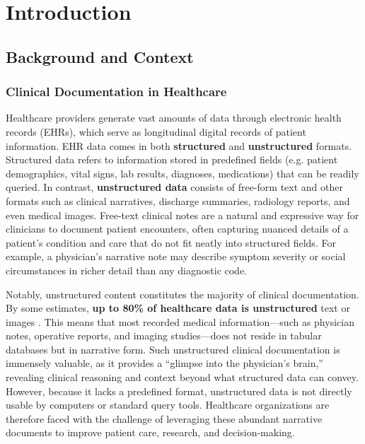 
\chapter{Introduction} %

\label{Chapter1} %


\newcommand{\keyword}[1]{\textbf{#1}}
\newcommand{\tabhead}[1]{\textbf{#1}}
\newcommand{\code}[1]{\texttt{#1}}
\newcommand{\file}[1]{\texttt{\bfseries#1}}
\newcommand{\option}[1]{\texttt{\itshape#1}}


\section{Background and Context}

\subsection{Clinical Documentation in Healthcare}

Healthcare providers generate vast amounts of data through electronic health records (EHRs), which serve as longitudinal digital records of patient information. EHR data comes in both \textbf{structured} and \textbf{unstructured} formats. Structured data refers to information stored in predefined fields (e.g. patient demographics, vital signs, lab results, diagnoses, medications) that can be readily queried. In contrast, \textbf{unstructured data} consists of free-form text and other formats such as clinical narratives, discharge summaries, radiology reports, and even medical images. Free-text clinical notes are a natural and expressive way for clinicians to document patient encounters, often capturing nuanced details of a patient's condition and care that do not fit neatly into structured fields. For example, a physician's narrative note may describe symptom severity or social circumstances in richer detail than any diagnostic code.

Notably, unstructured content constitutes the majority of clinical documentation. By some estimates, \textbf{up to 80\% of healthcare data is unstructured} text or images \parencite{Kong2019}. This means that most recorded medical information—such as physician notes, operative reports, and imaging studies—does not reside in tabular databases but in narrative form. Such unstructured clinical documentation is immensely valuable, as it provides a ``glimpse into the physician's brain,'' revealing clinical reasoning and context beyond what structured data can convey. However, because it lacks a predefined format, unstructured data is not directly usable by computers or standard query tools. Healthcare organizations are therefore faced with the challenge of leveraging these abundant narrative documents to improve patient care, research, and decision-making.

